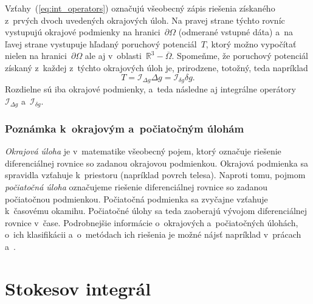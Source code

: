 \documentclass[a4paper,12pt]{book}
\newcommand{\INT}{\mathcal I}
\begin{document}
Vzťahy~(\ref{eq:int_operators}) označujú všeobecný zápis riešenia získaného 
z~prvých dvoch uvedených okrajových úloh.  Na pravej strane týchto rovníc 
vystupujú okrajové podmienky na hranici~$\partial \Omega$ (odmerané vstupné 
dáta) a~na ľavej strane vystupuje hľadaný poruchový potenciál~$T$, ktorý možno 
vypočítať nielen na hranici~$\partial\Omega$ ale aj v~oblasti~$\mathbb{R}^3 
- \overline\Omega$.  Spomeňme, že poruchový potenciál získaný z~každej z~týchto 
okrajových úloh je, prirodzene, totožný, teda napríklad
%
\begin{equation}
T = \INT_{\Delta g} \Delta g = \INT_{\delta g}\delta g{.}
\end{equation}
%
Rozdielne sú iba okrajové podmienky, a~teda následne aj integrálne 
operátory~$\INT_{\Delta g}$ a~$\INT_{\delta g}$.


\subsubsection{Poznámka k~okrajovým a~počiatočným úlohám}

\emph{Okrajová úloha} je v~matematike všeobecný pojem, ktorý označuje riešenie 
diferenciálnej rovnice so zadanou okrajovou podmienkou.  Okrajová podmienka sa 
spravidla vzťahuje k~priestoru (napríklad povrch telesa).  Naproti tomu, pojmom 
\emph{počiatočná úloha} označujeme riešenie diferenciálnej rovnice so zadanou 
počiatočnou podmienkou.  Počiatočná podmienka sa zvyčajne vzťahuje k~časovému 
okamihu.  Počiatočné úlohy sa teda zaoberajú vývojom diferenciálnej rovnice 
v~čase.  Podrobnejšie informácie o~okrajových a~počiatočných úlohách, o~ich 
klasifikácii a~o~metódach ich riešenia je možné nájsť napríklad v~prácach 
\textcite{Janak2006} a~\textcite{Macak2021}.


\section{Stokesov integrál}
\label{sec:stokes_integral}
\end{document}
